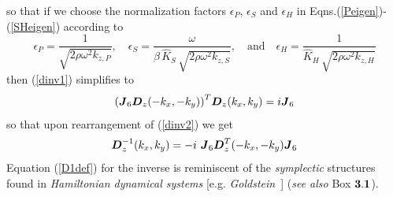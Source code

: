  so that if we choose the normalization factors ${\epsilon }_{P }$, 
${\epsilon }_{S}$ and ${\epsilon }_{H}$ in Eqns.(\ref{Peigen})-(\ref{SHeigen})
according to 
 \begin{equation} \label{epsdef}
{\epsilon }_{P }= \frac{1}{\sqrt{2 \rho {\omega }^{  2}{  k}_{  
z, P }}}, \quad
{\epsilon }_{S }= \frac{\omega}{\beta\,\hat{K}_{S }\,\sqrt{2 \rho {\omega }^{  2}  {  k}_{  
z, S }}}
, \quad \mbox{and} \quad
{\epsilon }_{H }= \frac{1}{\hat{K}_{H }\, \sqrt{2 \rho {\omega }^{  2}  {  k}_{  
z, H }}} 
\end{equation}
 then (\ref{dinv1}) simplifies to
\begin{equation} \label{dinv2}
{\left({{\mbox{\boldmath$\mit J$\unboldmath}}_{6}{\mbox{\boldmath$\mit D$\unboldmath}}_{z}(-{k}_{x},-{k}_{y})}\right)}^{T}{\mbox{\boldmath$\mit D$\unboldmath}}_{z}({k}_{x},{k}_{y})
=i {\mbox{\boldmath$\mit J$\unboldmath}}_{6}
\end{equation}
so that upon rearrangement of (\ref{dinv2}) we get
\begin{equation}	\label{D1def}
{\bmi  D}_{z}^{-1}({k}_{x},{k}_{y})=-i\	{\bmi  J}_6{\bmi  D}_{z}^{T}(-{k}_{x},-{k}_{y}){\bmi  J}_6
\end{equation}
Equation (\ref{D1def}) for the inverse is reminiscent of the {\em 
symplectic\/} structures found in {\em Hamiltonian dynamical systems\/} 
[e.g. {\em 
Goldstein}~] ({\em see also \/} {\sc Box} 
$\bf 3.1$). 



